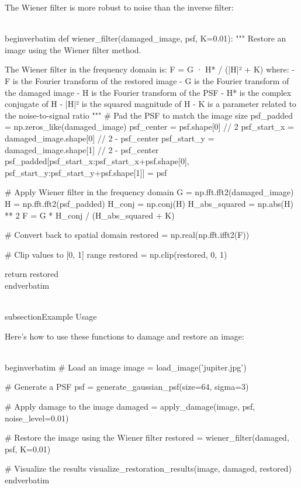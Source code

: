 The Wiener filter is more robust to noise than the inverse filter:

\\begin{verbatim}
def wiener_filter(damaged_image, psf, K=0.01):
    """
    Restore an image using the Wiener filter method.
    
    The Wiener filter in the frequency domain is: F = G · H* / (|H|² + K)
    where:
    - F is the Fourier transform of the restored image
    - G is the Fourier transform of the damaged image
    - H is the Fourier transform of the PSF
    - H* is the complex conjugate of H
    - |H|² is the squared magnitude of H
    - K is a parameter related to the noise-to-signal ratio
    """
    # Pad the PSF to match the image size
    psf_padded = np.zeros_like(damaged_image)
    psf_center = psf.shape[0] // 2
    psf_start_x = damaged_image.shape[0] // 2 - psf_center
    psf_start_y = damaged_image.shape[1] // 2 - psf_center
    psf_padded[psf_start_x:psf_start_x+psf.shape[0], 
               psf_start_y:psf_start_y+psf.shape[1]] = psf
    
    # Apply Wiener filter in the frequency domain
    G = np.fft.fft2(damaged_image)
    H = np.fft.fft2(psf_padded)
    H_conj = np.conj(H)
    H_abs_squared = np.abs(H) ** 2
    F = G * H_conj / (H_abs_squared + K)
    
    # Convert back to spatial domain
    restored = np.real(np.fft.ifft2(F))
    
    # Clip values to [0, 1] range
    restored = np.clip(restored, 0, 1)
    
    return restored
\\end{verbatim}

\\subsection{Example Usage}

Here's how to use these functions to damage and restore an image:

\\begin{verbatim}
# Load an image
image = load_image('jupiter.jpg')

# Generate a PSF
psf = generate_gaussian_psf(size=64, sigma=3)

# Apply damage to the image
damaged = apply_damage(image, psf, noise_level=0.01)

# Restore the image using the Wiener filter
restored = wiener_filter(damaged, psf, K=0.01)

# Visualize the results
visualize_restoration_results(image, damaged, restored)
\\end{verbatim}

